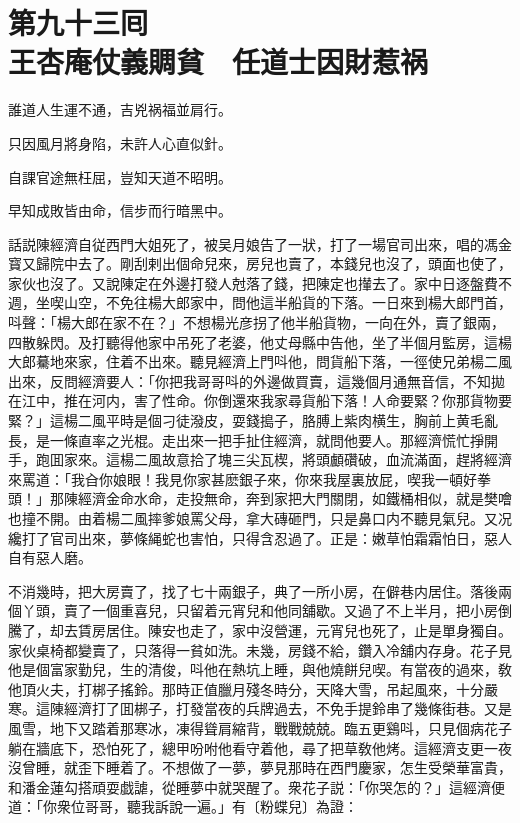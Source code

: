 
\chapter*{第九十三囘　\\王杏庵仗義賙貧　任道士因財惹祸}


\begin{myquote}
誰道人生運不通，吉兇祸福並肩行。

只因風月將身陷，未許人心直似針。

自課官途無枉屈，豈知天道不昭明。

早知成敗皆由命，信步而行暗黑中。
\end{myquote}

話説陳經濟自従西門大姐死了，被吴月娘告了一狀，打了一場官司出來，唱的馮金寳又歸院中去了。剛刮剌出個命兒來，房兒也賣了，本錢兒也沒了，頭面也使了，家伙也沒了。又說陳定在外邊打發人尅落了錢，把陳定也攆去了。家中日逐盤費不週，坐喫山空，不免往楊大郎家中，問他這半船貨的下落。一日來到楊大郎門首，呌聲：「楊大郎在家不在？」不想楊光彦拐了他半船貨物，一向在外，賣了銀兩，四散躲閃。及打聽得他家中吊死了老婆，他丈母縣中告他，坐了半個月監房，這楊大郎驀地來家，住着不出來。聽見經濟上門呌他，問貨船下落，一徑使兄弟楊二風出來，反問經濟要人：「你把我哥哥呌的外邊做買賣，這幾個月通無音信，不知拋在江中，推在河内，害了性命。你倒還來我家尋貨船下落！人命要緊？你那貨物要緊？」這楊二風平時是個刁徒潑皮，耍錢搗子，胳膊上紫肉横生，胸前上黄毛亂長，是一條直率之光棍。走出來一把手扯住經濟，就問他要人。那經濟慌忙掙開手，跑囬家來。這楊二風故意拾了塊三尖瓦楔，將頭顱礸破，血流滿面，趕將經濟來罵道：「我㒲你娘眼！我見你家甚麽銀子來，你來我屋裏放屁，喫我一頓好拳頭！」那陳經濟金命水命，走投無命，奔到家把大門關閉，如鐵桶相似，就是樊噲也撞不開。由着楊二風摔爹娘罵父母，拿大磚砸門，只是鼻口内不聽見氣兒。又况纔打了官司出來，夢條䋲蛇也害怕，只得含忍過了。正是：嫩草怕霜霜怕日，惡人自有惡人磨。

不消幾時，把大房賣了，找了七十兩銀子，典了一所小房，在僻巷内居住。落後兩個丫頭，賣了一個重喜兒，只留着元宵兒和他同舖歇。又過了不上半月，把小房倒騰了，却去賃房居住。陳安也走了，家中沒營運，元宵兒也死了，止是單身獨自。家伙桌椅都變賣了，只落得一貧如洗。未幾，房錢不給，鑽入冷舖内存身。花子見他是個富家勤兒，生的清俊，呌他在熱坑上睡，與他燒餅兒喫。有當夜的過來，敎他頂火夫，打梆子搖鈴。那時正值臘月殘冬時分，天降大雪，吊起風來，十分嚴寒。這陳經濟打了囬梆子，打發當夜的兵牌過去，不免手提鈴串了幾條街巷。又是風雪，地下又踏着那寒冰，凍得聳肩縮背，戰戰兢兢。臨五更鷄呌，只見個病花子躺在牆底下，恐怕死了，總甲吩咐他看守着他，尋了把草敎他烤。這經濟支更一夜沒曾睡，就歪下睡着了。不想做了一夢，夢見那時在西門慶家，怎生受榮華富貴，和潘金蓮勾搭頑耍戯謔，從睡夢中就哭醒了。衆花子説：「你哭怎的？」這經濟便道：「你衆位哥哥，聽我訴說一遍。」有〔粉蝶兒〕為證：

